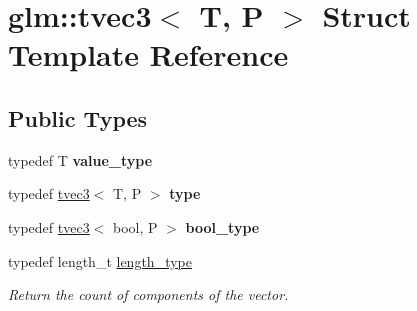 \hypertarget{structglm_1_1tvec3}{}\section{glm\+:\+:tvec3$<$ T, P $>$ Struct Template Reference}
\label{structglm_1_1tvec3}
\subsection*{Public Types}
\begin{DoxyCompactItemize}
\item 
\mbox{\label{structglm_1_1tvec3_a9831435e7980f26529de581ad8fed6f0}} 
typedef T {\bfseries value\+\_\+type}
\item 
\mbox{\label{structglm_1_1tvec3_ac2fe9ecb34ed8919d08879311ec74b8a}} 
typedef \hyperlink{structglm_1_1tvec3}{tvec3}$<$ T, P $>$ {\bfseries type}
\item 
\mbox{\label{structglm_1_1tvec3_a7d83af99df8b5a51688967cd08789917}} 
typedef \hyperlink{structglm_1_1tvec3}{tvec3}$<$ bool, P $>$ {\bfseries bool\+\_\+type}
\item 
\mbox{\label{structglm_1_1tvec3_a3a79c6a1cfc9fb8821a0a878fa2de91a}} 
typedef length\+\_\+t \hyperlink{structglm_1_1tvec3_a3a79c6a1cfc9fb8821a0a878fa2de91a}{length\+\_\+type}
\begin{DoxyCompactList}\small\item\em Return the count of components of the vector. \end{DoxyCompactList}\end{DoxyCompactItemize}
